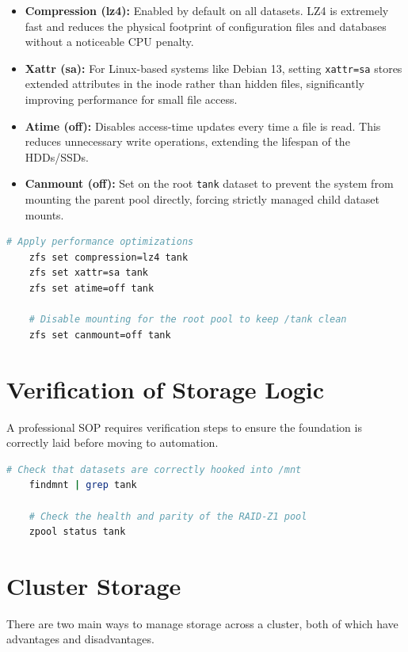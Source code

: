 \begin{itemize}
	\item \textbf{Compression (lz4):} Enabled by default on all datasets. LZ4 is extremely fast and reduces the physical footprint of configuration files and databases without a noticeable CPU penalty.
	\item \textbf{Xattr (sa):} For Linux-based systems like Debian 13, setting \texttt{xattr=sa} stores extended attributes in the inode rather than hidden files, significantly improving performance for small file access.
	\item \textbf{Atime (off):} Disables access-time updates every time a file is read. This reduces unnecessary write operations, extending the lifespan of the HDDs/SSDs.
	\item \textbf{Canmount (off):} Set on the root \texttt{tank} dataset to prevent the system from mounting the parent pool directly, forcing strictly managed child dataset mounts.
\end{itemize}

\begin{lstlisting}[language=bash, caption=Optimizing Dataset Properties]
	# Apply performance optimizations
	zfs set compression=lz4 tank
	zfs set xattr=sa tank
	zfs set atime=off tank
	
	# Disable mounting for the root pool to keep /tank clean
	zfs set canmount=off tank
\end{lstlisting}

\section{Verification of Storage Logic}
A professional SOP requires verification steps to ensure the foundation is correctly laid before moving to automation.

\begin{lstlisting}[language=bash, caption=Verifying the Foundation]
	# Check that datasets are correctly hooked into /mnt
	findmnt | grep tank
	
	# Check the health and parity of the RAID-Z1 pool
	zpool status tank
\end{lstlisting}


\section{Cluster Storage}
There are two main ways to manage storage across a cluster, both of which have advantages and disadvantages.

